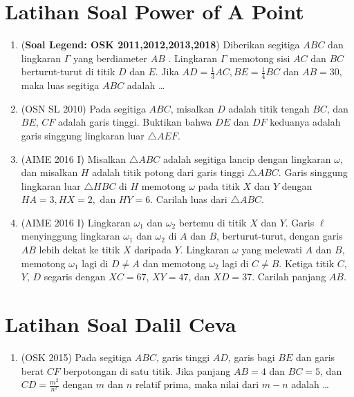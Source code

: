 \documentclass[12pt]{scrartcl}
\begin{document}
\section{Latihan Soal Power of A Point}
\begin{enumerate}
    \item (\textbf{Soal Legend: OSK 2011,2012,2013,2018}) Diberikan segitiga $ABC$ dan lingkaran $\Gamma$ yang berdiameter $AB$ . Lingkaran $\Gamma$ memotong sisi $AC$ dan $BC$ berturut-turut di titik $D$ dan $E$. Jika $AD = \frac13 AC, BE =\frac14 BC$ dan $AB = 30$, maka luas segitiga $ABC$ adalah \dots

    \item (OSN SL 2010) Pada segitiga $ABC$, misalkan $D$ adalah titik tengah $BC$, dan $BE$, $CF$ adalah garis tinggi. Buktikan bahwa $DE$ dan $DF$ keduanya adalah garis singgung lingkaran luar $\triangle AEF$. %

    \item (AIME 2016 I) Misalkan $\triangle ABC$ adalah segitiga lancip dengan lingkaran $\omega,$ dan misalkan $H$ adalah titik potong dari garis tinggi $\triangle ABC.$ Garis singgung lingkaran luar $\triangle HBC$ di $H$ memotong $\omega$ pada titik $X$ dan $Y$ dengan $HA=3,HX=2,$ dan $HY=6.$ Carilah luas dari $\triangle ABC$.

    \item (AIME 2016 I) Lingkaran $\omega_1$ dan $\omega_2$ bertemu di titik $X$ dan $Y$. Garis $\ell$ menyinggung lingkaran $\omega_1$ dan $\omega_2$ di $A$ dan $B$, berturut-turut, dengan garis $AB$ lebih dekat ke titik $X$ daripada $Y$. Lingkaran $\omega$ yang melewati $A$ dan $B$, memotong $\omega_1$ lagi di $D \neq A$ dan memotong $\omega_2$ lagi di $C \neq B$. Ketiga titik $C$, $Y$, $D$ segaris dengan $XC = 67$, $XY = 47$, dan $XD = 37$. Carilah panjang $AB$.
\end{enumerate}
\section{Latihan Soal Dalil Ceva}
\begin{enumerate}
    \item (OSK 2015) Pada segitiga $ABC$, garis tinggi $AD$, garis bagi $BE$ dan garis berat $CF$ berpotongan di satu titik. Jika panjang $AB = 4$ dan $BC = 5$, dan $CD = \frac{m^2}{n^2}$ dengan $m$ dan $n$ relatif prima, maka nilai dari $m - n$ adalah \ldots
\end{enumerate}
\end{document}
